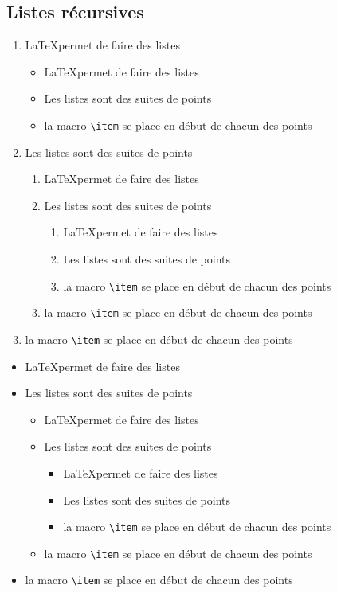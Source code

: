 \documentclass[francais, 10pt]{article}
\begin{document}
		\subsection{Listes récursives}
			\begin{enumerate}
				\item \LaTeX permet de faire des listes
				\begin{itemize}
					\item \LaTeX permet de faire des listes
					\item Les listes sont des suites de points
					\item la macro \verb|\item| se place en début de chacun des points
				\end{itemize}
				\item Les listes sont des suites de points
				\begin{enumerate}
					\item \LaTeX permet de faire des listes
					\item Les listes sont des suites de points
					\begin{enumerate}
						\item \LaTeX permet de faire des listes
						\item Les listes sont des suites de points
						\item la macro \verb|\item| se place en début de chacun des points
					\end{enumerate}
					\item la macro \verb|\item| se place en début de chacun des points
				\end{enumerate}
				\item la macro \verb|\item| se place en début de chacun des points
			\end{enumerate}
			
			\begin{itemize}
				\item \LaTeX permet de faire des listes
				\item Les listes sont des suites de points
				\begin{itemize}
					\item \LaTeX permet de faire des listes
					\item Les listes sont des suites de points
					\begin{itemize}
						\item \LaTeX permet de faire des listes
						\item Les listes sont des suites de points
						\item la macro \verb|\item| se place en début de chacun des points
					\end{itemize}
					\item la macro \verb|\item| se place en début de chacun des points
				\end{itemize}
				\item la macro \verb|\item| se place en début de chacun des points
			\end{itemize}
\end{document}
